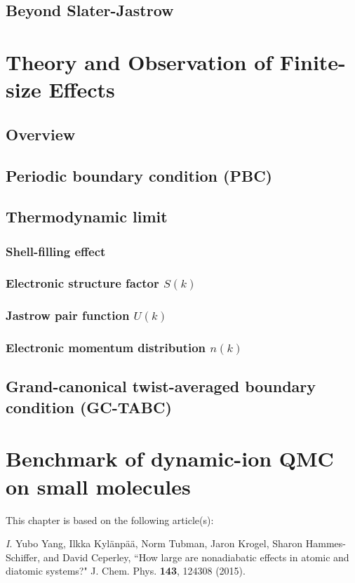 \documentclass[draftthesis,fullpage]{uiucthesis}
\begin{document}
\section{Beyond Slater-Jastrow}

\chapter{Theory and Observation of Finite-size Effects}
\section{Overview}
\section{Periodic boundary condition (PBC)}
\section{Thermodynamic limit}
\subsection{Shell-filling effect}
\subsection{Electronic structure factor $S(k)$}
\subsection{Jastrow pair function $U(k)$}
\subsection{Electronic momentum distribution $n(k)$}
\section{Grand-canonical twist-averaged boundary condition (GC-TABC)}

\chapter{Benchmark of dynamic-ion QMC on small molecules}
This chapter is based on the following article(s):

\textit{I}. Yubo Yang, Ilkka Kyl\"anp\"a\"a, Norm Tubman, Jaron Krogel, Sharon Hammes-Schiffer, and David Ceperley, ``How large are nonadiabatic effects in atomic and diatomic systems?" J. Chem. Phys. \textbf{143}, 124308 (2015).
\end{document}
